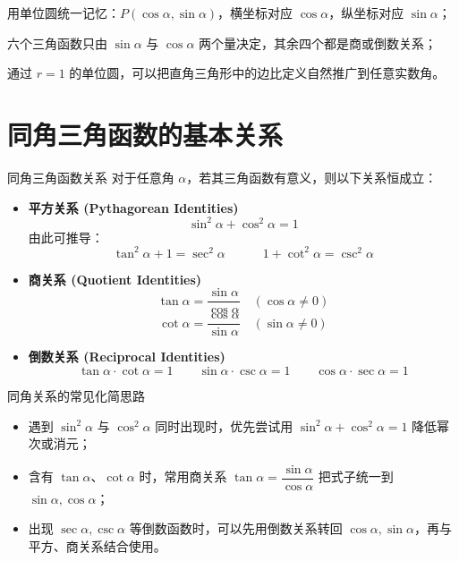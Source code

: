 \documentclass[a4paper,11pt]{ctexart}
\begin{document}
\begin{focuspoints}
  \item 用单位圆统一记忆：$P(\cos\alpha,\sin\alpha)$，横坐标对应 $\cos\alpha$，纵坐标对应 $\sin\alpha$；
  \item 六个三角函数只由 $\sin\alpha$ 与 $\cos\alpha$ 两个量决定，其余四个都是商或倒数关系；
  \item 通过 $r=1$ 的单位圆，可以把直角三角形中的边比定义自然推广到任意实数角。
\end{focuspoints}

\section{同角三角函数的基本关系}

\begin{theorembox}{同角三角函数关系}
对于任意角 $\alpha$，若其三角函数有意义，则以下关系恒成立：
\begin{itemize}
    \item \textbf{平方关系 (Pythagorean Identities)}
    \begin{equation}
        \sin^2\alpha + \cos^2\alpha = 1
    \end{equation}
    由此可推导：
    \[ \tan^2\alpha + 1 = \sec^2\alpha \quad \quad \quad 1 + \cot^2\alpha = \csc^2\alpha \]

    \item \textbf{商关系 (Quotient Identities)}
    \begin{equation}
        \tan\alpha = \frac{\sin\alpha}{\cos\alpha} \quad (\cos\alpha \neq 0)
    \end{equation}
    \[ \cot\alpha = \frac{\cos\alpha}{\sin\alpha} \quad (\sin\alpha \neq 0) \]

	    \item \textbf{倒数关系 (Reciprocal Identities)}
	    \[ \tan\alpha \cdot \cot\alpha = 1 \quad \quad \sin\alpha \cdot \csc\alpha = 1 \quad \quad \cos\alpha \cdot \sec\alpha = 1 \]
\end{itemize}
\end{theorembox}

\begin{summarybox}{同角关系的常见化简思路}
  \begin{itemize}
    \item 遇到 $\sin^2\alpha$ 与 $\cos^2\alpha$ 同时出现时，优先尝试用 $\sin^2\alpha + \cos^2\alpha = 1$ 降低幂次或消元；
    \item 含有 $\tan\alpha$、$\cot\alpha$ 时，常用商关系 $\tan\alpha=\dfrac{\sin\alpha}{\cos\alpha}$ 把式子统一到 $\sin\alpha,\cos\alpha$；
    \item 出现 $\sec\alpha,\csc\alpha$ 等倒数函数时，可以先用倒数关系转回 $\cos\alpha,\sin\alpha$，再与平方、商关系结合使用。
  \end{itemize}
\end{summarybox}
\end{document}

